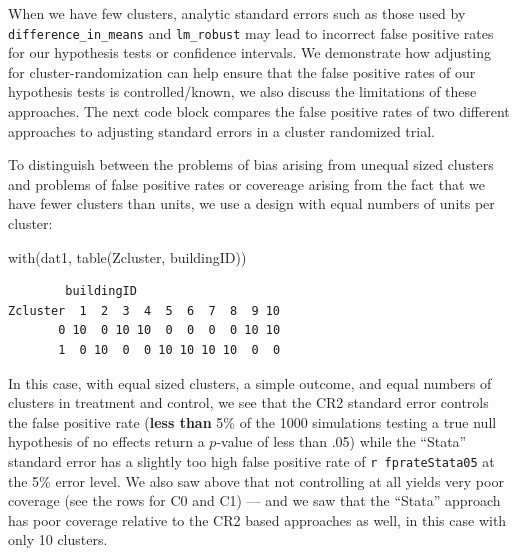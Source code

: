\documentclass[
  12pt,
]{book}
\newenvironment{Shaded}{\begin{snugshade}}{\end{snugshade}}
\newcommand{\FunctionTok}[1]{\textcolor[rgb]{0.00,0.00,0.00}{#1}}
\newcommand{\NormalTok}[1]{#1}
\theoremstyle{definition}
\theoremstyle{definition}
\theoremstyle{definition}
\theoremstyle{remark}
\begin{document}
When we have few clusters, analytic standard errors such as those used
by \texttt{difference\_in\_means} and \texttt{lm\_robust} may lead to
incorrect false positive rates for our hypothesis tests or confidence
intervals. We demonstrate how adjusting for cluster-randomization can
help ensure that the false positive rates of our hypothesis tests is
controlled/known, we also discuss the limitations of these approaches.
The next code block compares the false positive rates of two different
approaches to adjusting standard errors in a cluster randomized trial.

To distinguish between the problems of bias arising from unequal sized
clusters and problems of false positive rates or covereage arising from
the fact that we have fewer clusters than units, we use a design with
equal numbers of units per cluster:

\begin{Shaded}
\begin{Highlighting}[]
\FunctionTok{with}\NormalTok{(dat1, }\FunctionTok{table}\NormalTok{(Zcluster, buildingID))}
\end{Highlighting}
\end{Shaded}

\begin{verbatim}
        buildingID
Zcluster  1  2  3  4  5  6  7  8  9 10
       0 10  0 10 10  0  0  0  0 10 10
       1  0 10  0  0 10 10 10 10  0  0
\end{verbatim}

In this case, with equal sized clusters, a simple outcome, and equal
numbers of clusters in treatment and control, we see that the CR2
standard error controls the false positive rate (\textbf{less than} 5\%
of the 1000 simulations testing a true null hypothesis of no effects
return a \(p\)-value of less than .05) while the ``Stata'' standard
error has a slightly too high false positive rate of
\texttt{r\ fprateStata05} at the 5\% error level. We also saw above that
not controlling at all yields very poor coverage (see the rows for C0
and C1) --- and we saw that the ``Stata'' approach has poor coverage
relative to the CR2 based approaches as well, in this case with only 10
clusters.
\end{document}
